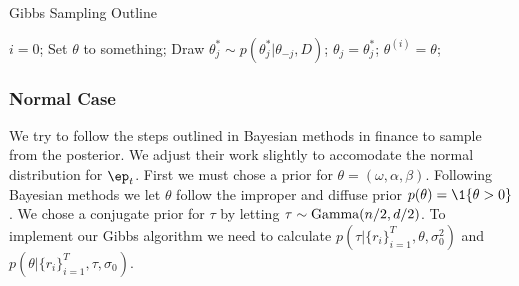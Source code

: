 \documentclass{article}
\begin{document}
\begin{algorithm}
\caption{Gibbs Sampling Outline}
\label{generic-gibbs:alg}
\begin{algorithmic}
\STATE $i = 0$;
\STATE Set $\theta$ to something;
\REPEAT
{}
  \STATE Draw $\theta_j^* \sim p(\theta_j^* | \theta_{-j}, D)$;
  \STATE $\theta_j = \theta_j^*$;
\ENDFOR
\STATE $\theta^{(i)} = \theta$;
\end{algorithmic}
\end{algorithm}

\subsubsection{Normal Case}

We try to follow the steps outlined in Bayesian methods in finance to sample from the posterior.  We adjust their work slightly to accomodate the normal distribution for $\ep_t$.  First we must chose a prior for $\theta = (\omega, \alpha, \beta)$.  Following Bayesian methods we let $\theta$ follow the improper and diffuse prior $p(\theta) = \1 \{ \theta > 0 \}$.  We chose a conjugate prior for $\tau$ by letting $\tau \sim \textmd{Gamma}(n/2, d/2)$.  To implement our Gibbs algorithm we need to calculate $p(\tau | \{r_i\}_{i=1}^T, \theta, \sigma^2_0)$ and $p(\theta | \{r_i\}_{i=1}^T, \tau, \sigma_0)$.
\end{document}
